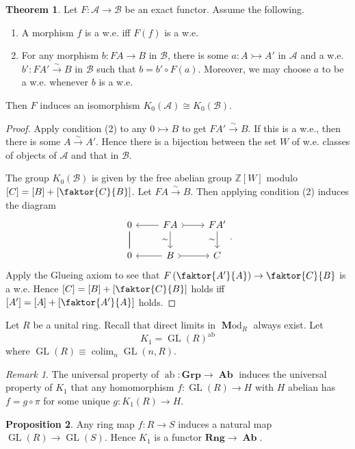 \documentclass[10pt,letterpaper,cm]{nupset}
\theoremstyle{definition}
\theoremstyle{theorem}
\newtheorem{theorem}{Theorem}
\newtheorem{prop}[theorem]{Proposition}
\theoremstyle{remark}
\newtheorem{remark}{Remark}
\newcommand{\Z}{\mathbb Z}
\newcommand{\1}{\mathbf{1}}
\renewcommand{\a}{\mathscr{A}}
\renewcommand{\b}{\mathscr{B}}
\newcommand{\0}{\vec 0}
\DeclareMathOperator*{\GL}{GL}
\DeclareMathOperator{\ab}{ab}
\DeclareMathOperator{\colim}{colim}
\DeclareMathOperator{\Ab}{\mathbf{Ab}}
\DeclareMathOperator{\Mod}{\mathbf Mod}
\begin{document}
\begin{theorem}
Let $F : \a \to \b$ be an exact functor. Assume the following.
\begin{enumerate}[label=(\arabic*)]
\item A morphism $f$ is a w.e. iff $F(f)$ is a w.e.
\item For any morphism $b : FA \to B$ in $\b$, there is some $a: A \rightarrowtail A'$ in $\a$ and a w.e. $b' : FA' \overset{\sim}{\longrightarrow} B$ in $\b$ such that $b = b' \circ F(a)$. Moreover, we may choose $a$ to be a w.e. whenever $b$ is a w.e.
\end{enumerate}
Then $F$ induces an isomorphism $K_0(\a) \cong K_0(\b)$.
\end{theorem}
\begin{proof}
Apply condition (2) to any $0 \rightarrowtail B$ to get $FA' \overset{\sim}{\longrightarrow} B$. If this is a w.e., then there is some $A \overset{\sim}{\longrightarrow} A'$. Hence there is a bijection between the set $W$ of w.e. classes of objects of $\a$ and that in $\b$. 
\medskip

 The group $K_0(\b)$ is given by the free abelian group $\Z[W]$ modulo $[C] = [B] + \left[\faktor{C}{B}\right]$. Let $FA \overset{\sim}{\longrightarrow}  B$. Then applying condition (2) induces the diagram
\[
\begin{tikzcd}
0 \arrow[d, no head] \arrow[d, no head] & FA \arrow[d, "\sim"'] \arrow[r, tail] \arrow[l] & FA' \arrow[d, "\sim"'] \\
0 & B \arrow[r, tail] \arrow[l] & C
\end{tikzcd}.
\]
Apply the Glueing axiom to see that $F\left(\faktor{A'}{A}\right) \to \faktor{C}{B}$ is a w.e. Hence $[C] = [B] + \left[\faktor{C}{B}\right]$
 holds iff $[A'] = [A] + \left[\faktor{A'}{A}\right]$ holds.
\end{proof}

\bigskip


Let $R$ be a unital ring. Recall that direct limits in $\Mod_R$ always exist. Let $$K_1 = \GL(R)^{\ab}$$ where $\GL(R) \equiv\colim_n \GL(n, R)$.

\begin{remark}
The universal property of $\ab: \mathbf{Grp} \to \Ab$ induces the universal property of $K_1$ that any homomorphism $f: \GL(R) \to H$ with $H$ abelian has $f = g \circ \pi$ for some unique $g: K_1(R) \to H$.
\end{remark}

\begin{prop}
Any ring map $f: R \to S$ induces a natural map $\GL(R) \to \GL(S)$. Hence $K_1$ is a functor $\mathbf{Rng} \to \Ab$.
\end{prop}
\end{document}
